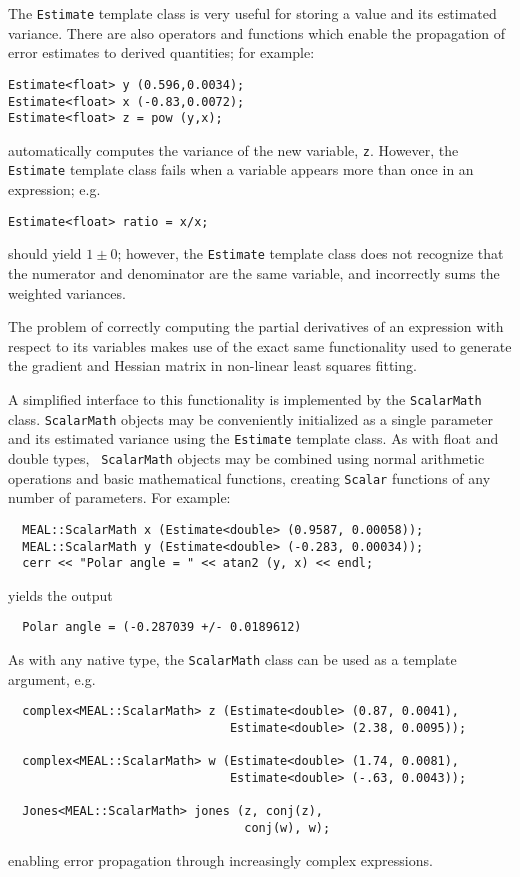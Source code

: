 \documentclass[12pt]{article}
\begin{document}
The {\tt Estimate} template class is very useful for storing a value
and its estimated variance.  There are also operators and functions
which enable the propagation of error estimates to derived quantities;
for example:
\begin{verbatim}
Estimate<float> y (0.596,0.0034);
Estimate<float> x (-0.83,0.0072);
Estimate<float> z = pow (y,x);
\end{verbatim}
automatically computes the variance of the new variable, {\tt z}.
However, the {\tt Estimate} template class fails when a variable
appears more than once in an expression; e.g.
\begin{verbatim}
Estimate<float> ratio = x/x;
\end{verbatim}
should yield $1\pm0$; however, the {\tt Estimate} template class does
not recognize that the numerator and denominator are the same
variable, and incorrectly sums the weighted variances.

The problem of correctly computing the partial derivatives of an
expression with respect to its variables makes use of the exact same
functionality used to generate the gradient and Hessian matrix in
non-linear least squares fitting.

A simplified interface to this functionality is implemented by the
{\tt ScalarMath} class.  {\tt ScalarMath} objects may be conveniently
initialized as a single parameter and its estimated variance using the
{\tt Estimate} template class.  As with float and double types, {\tt
ScalarMath} objects may be combined using normal arithmetic operations
and basic mathematical functions, creating {\tt Scalar} functions of
any number of parameters.  For example:
\begin{verbatim}
  MEAL::ScalarMath x (Estimate<double> (0.9587, 0.00058));
  MEAL::ScalarMath y (Estimate<double> (-0.283, 0.00034));
  cerr << "Polar angle = " << atan2 (y, x) << endl;
\end{verbatim}
yields the output
\begin{verbatim}
  Polar angle = (-0.287039 +/- 0.0189612)
\end{verbatim}
\newpage
\noindent
As with any native type, the {\tt ScalarMath} class can be used as a
template argument, e.g.
\begin{verbatim}
  complex<MEAL::ScalarMath> z (Estimate<double> (0.87, 0.0041),
                               Estimate<double> (2.38, 0.0095));

  complex<MEAL::ScalarMath> w (Estimate<double> (1.74, 0.0081),
                               Estimate<double> (-.63, 0.0043));

  Jones<MEAL::ScalarMath> jones (z, conj(z),
                                 conj(w), w);
\end{verbatim}
enabling error propagation through increasingly complex expressions.
\end{document}
